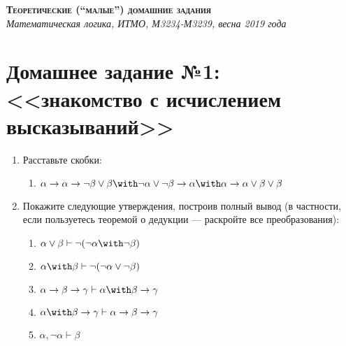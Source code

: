 \documentclass[10pt,a4paper,oneside]{article}
\begin{document}
\begin{center}{\Large\textsc{\textbf{Теоретические (``малые'') домашние задания}}}\\
             \it Математическая логика, ИТМО, М3234-М3239, весна 2019 года\end{center}

\section*{Домашнее задание №1: <<знакомство с исчислением высказываний>>}

\begin{enumerate}

\item Расставьте скобки:
\begin{enumerate}
\item $\alpha\to\alpha\to\neg\beta\vee\beta\with\neg\alpha\vee\neg\beta\to\alpha\with\alpha\to\alpha\vee\beta\vee\beta$
\end{enumerate}

\item Покажите следующие утверждения, построив полный вывод (в частности, если пользуетесь теоремой о дедукции --- 
раскройте все преобразования):
\begin{enumerate}
\item $\alpha\vee\beta \vdash \neg(\neg\alpha\with\neg\beta)$
\item $\alpha\with\beta \vdash \neg(\neg\alpha\vee\neg\beta)$
\item $\alpha\to\beta\to\gamma \vdash \alpha\with\beta\to\gamma$
\item $\alpha\with\beta\to\gamma \vdash \alpha\to\beta\to\gamma$
\item $\alpha,\neg\alpha \vdash \beta$
\end{enumerate}


\end{enumerate}
\end{document}
